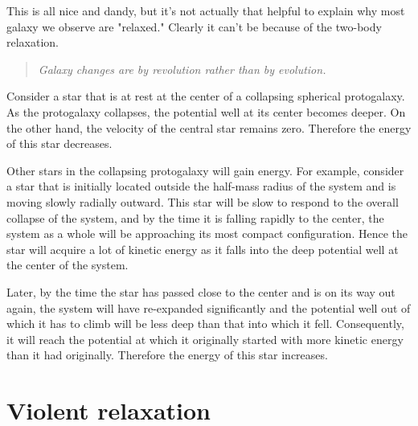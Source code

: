 \par This is all nice and dandy, but it's not actually that helpful to explain why most galaxy we observe are "relaxed." Clearly it can't be because of the two-body relaxation.
\begin{quote}
    \emph{Galaxy changes are by revolution rather than by evolution.}
\end{quote}
\par Consider a star that is at rest at the center of a collapsing spherical protogalaxy. As the protogalaxy collapses, the potential well at its center becomes deeper. On the other hand, the velocity of the central star remains zero. Therefore the energy of this star decreases.
\par Other stars in the collapsing protogalaxy will gain energy. For example, consider a star that is initially located outside the half-mass radius of the system and is moving slowly radially outward. This star will be slow to respond to the overall collapse of the system, and by the time it is falling rapidly to the center, the system as a whole will be approaching its most compact configuration. Hence the star will acquire a lot of kinetic energy as it falls into the deep potential well at the center of the system.
\par Later, by the time the star has passed close to the center and is on its way out again, the system will have re-expanded significantly and the potential well out of which it has to climb will be less deep than that into which it fell. Consequently, it will reach the potential at which it originally started with more kinetic energy than it had originally. Therefore the energy of this star increases.

\section{Violent relaxation}

